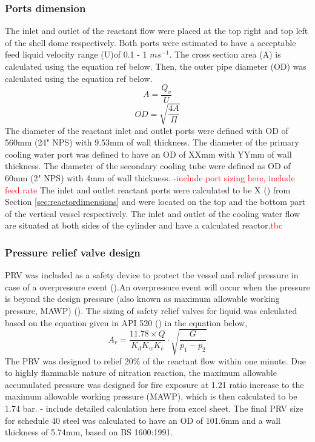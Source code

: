 \subsubsection{Ports dimension}
The inlet and outlet of the reactant flow were placed at the top right and top left of the shell dome respectively. Both ports were estimated to have a acceptable feed liquid velocity range (U)of 0.1 - 1 $ms^{-1}$. The cross section area (A) is calculated using the equation ref below. Then, the outer pipe diameter (OD) was calculated using the equation ref below. 
\begin{equation}
    A = \frac{Q_v}{U}
    \label{eqn:area}
\end{equation}
\begin{equation}
    OD = \sqrt{\frac{4A}{\Pi}}
    \label{eqn:portOD}
\end{equation}
The diameter of the reactant inlet and outlet ports were defined with OD of 560mm (24" NPS) with 9.53mm of wall thickness. 
The diameter of the primary cooling water port was defined to have an OD of XXmm with YYmm of wall thickness. 
The diameter of the secondary cooling tube were defined as OD of 60mm (2" NPS) with 4mm of wall thickness. 
\textcolor{red}{-include port sizing here, include feed rate}
The inlet and outlet reactant ports were calculated to be X () from Section \ref{sec:reactordimensions} and were located on the top and the bottom part of the vertical vessel respectively. 
The inlet and outlet of the cooling water flow are situated at both sides of the cylinder and have a calculated  reactor.\textcolor{red}{tbc}

\subsubsection{Pressure relief valve design}
PRV was included as a safety device to protect the vessel and relief pressure in case of a overpressure event ().An overpressure event will occur when the pressure is beyond the design pressure (also known as maximum allowable working pressure, MAWP) (). The sizing of safety relief valves for liquid was calculated based on the equation given in API 520 () in the equation below,
\begin{equation}
    A_r = \frac{11.78 \times Q}{K_d K_w K_c} \cdot \sqrt{\frac{G}{p_1-p_2}}
\end{equation}
The PRV was designed to relief 20\% of the reactant flow within one minute. Due to highly flammable nature of nitration reaction, the maximum allowable accumulated pressure was designed for fire exposure at 1.21 ratio increase to the maximum allowable working pressure (MAWP), which is then calculated to be 1.74 bar. 
- include detailed calculation here from excel sheet. 
The final PRV size for schedule 40 steel was calculated to have an OD of 101.6mm and a wall thickness of 5.74mm, based on BS 1600:1991.

